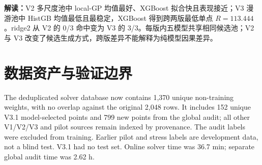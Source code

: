 \documentclass[8pt,a4paper]{article}
\begin{document}
\textbf{解读：}V2 多尺度池中 local-GP 均值最好、XGBoost 拟合快且表现接近；V3 漫游池中 HistGB 均值最低且最稳定，XGBoost 得到跨两版最低单点 $R=113.444$。ridge2 从 V2 的 0/3 命中变为 V3 的 3/3。每版内五模型共享相同候选池；V2 与 V3 改变了候选生成方式，跨版差异不能解释为纯模型因果差异。
\section{数据资产与验证边界}
The deduplicated solver database now contains 1,370 unique non-training weights, with no overlap against the original 2,048 rows. It includes 152 unique V3.1 model-selected points and 799 new points from the global audit; all other V1/V2/V3 and pilot sources remain indexed by provenance. The audit labels were excluded from training. Earlier pilot and stress labels are development data, not a blind test. V3.1 had no test set. Online solver time was 36.7 min; separate global audit time was 2.62 h.
\end{document}
